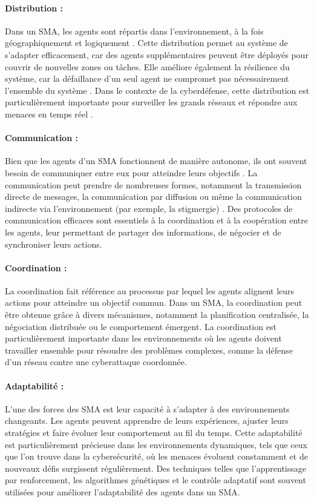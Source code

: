 \paragraph{Distribution :}
Dans un SMA, les agents sont répartis dans l'environnement, à la fois géographiquement et logiquement \cite{ferber1999multi}. Cette distribution permet au système de s'adapter efficacement, car des agents supplémentaires peuvent être déployés pour couvrir de nouvelles zones ou tâches. Elle améliore également la résilience du système, car la défaillance d'un seul agent ne compromet pas nécessairement l'ensemble du système \cite{durfee1999distributed}. Dans le contexte de la cyberdéfense, cette distribution est particulièrement importante pour surveiller les grands réseaux et répondre aux menaces en temps réel \cite{shakarian2015cyber}.

\paragraph{Communication :}
Bien que les agents d'un SMA fonctionnent de manière autonome, ils ont souvent besoin de communiquer entre eux pour atteindre leurs objectifs \cite{huhns1999multiagent}. La communication peut prendre de nombreuses formes, notamment la transmission directe de messages, la communication par diffusion ou même la communication indirecte via l'environnement (par exemple, la stigmergie) \cite{dorigo2000ant}. Des protocoles de communication efficaces sont essentiels à la coordination et à la coopération entre les agents, leur permettant de partager des informations, de négocier et de synchroniser leurs actions.

\paragraph{Coordination :}
La coordination fait référence au processus par lequel les agents alignent leurs actions pour atteindre un objectif commun. Dans un SMA, la coordination peut être obtenue grâce à divers mécanismes, notamment la planification centralisée, la négociation distribuée ou le comportement émergent. La coordination est particulièrement importante dans les environnements où les agents doivent travailler ensemble pour résoudre des problèmes complexes, comme la défense d'un réseau contre une cyberattaque coordonnée.

\paragraph{Adaptabilité :}
L’une des forces des SMA est leur capacité à s’adapter à des environnements changeants. Les agents peuvent apprendre de leurs expériences, ajuster leurs stratégies et faire évoluer leur comportement au fil du temps. Cette adaptabilité est particulièrement précieuse dans les environnements dynamiques, tels que ceux que l’on trouve dans la cybersécurité, où les menaces évoluent constamment et de nouveaux défis surgissent régulièrement. Des techniques telles que l’apprentissage par renforcement, les algorithmes génétiques et le contrôle adaptatif sont souvent utilisées pour améliorer l’adaptabilité des agents dans un SMA.

